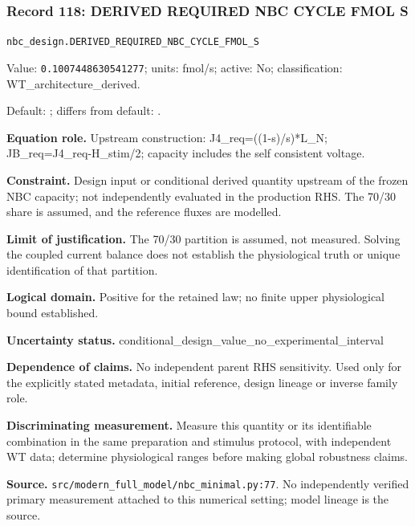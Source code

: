 \subsubsection*{Record 118: DERIVED REQUIRED NBC CYCLE FMOL S}
{\small \nolinkurl{nbc_design.DERIVED_REQUIRED_NBC_CYCLE_FMOL_S}\par

Value: \texttt{0.1007448630541277}; units: fmol/s; active: No; classification: WT\_architecture\_derived.\par

Default: ; differs from default: .\par

\textbf{Equation role.} Upstream construction: J4\_req=((1-s)/s)*L\_N; JB\_req=J4\_req-H\_stim/2; capacity includes the self consistent voltage.\par

\textbf{Constraint.} Design input or conditional derived quantity upstream of the frozen NBC capacity; not independently evaluated in the production RHS. The 70/30 share is assumed, and the reference fluxes are modelled.\par

\textbf{Limit of justification.} The 70/30 partition is assumed, not measured. Solving the coupled current balance does not establish the physiological truth or unique identification of that partition.\par

\textbf{Logical domain.} Positive for the retained law; no finite upper physiological bound established.\par

\textbf{Uncertainty status.} conditional\_design\_value\_no\_experimental\_interval\par

\textbf{Dependence of claims.} No independent parent RHS sensitivity. Used only for the explicitly stated metadata, initial reference, design lineage or inverse family role.\par

\textbf{Discriminating measurement.} Measure this quantity or its identifiable combination in the same preparation and stimulus protocol, with independent WT data; determine physiological ranges before making global robustness claims.\par

\textbf{Source.} \nolinkurl{src/modern_full_model/nbc_minimal.py:77}. No independently verified primary measurement attached to this numerical setting; model lineage is the source.\par}

